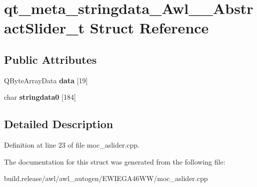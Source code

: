\hypertarget{structqt__meta__stringdata___awl_____abstract_slider__t}{}\section{qt\+\_\+meta\+\_\+stringdata\+\_\+\+Awl\+\_\+\+\_\+\+Abstract\+Slider\+\_\+t Struct Reference}
\label{structqt__meta__stringdata___awl_____abstract_slider__t}
\subsection*{Public Attributes}
\begin{DoxyCompactItemize}
\item 
\mbox{\label{structqt__meta__stringdata___awl_____abstract_slider__t_a981b69e61eccb9d7469d9cd4b51aa298}} 
Q\+Byte\+Array\+Data {\bfseries data} \mbox{[}19\mbox{]}
\item 
\mbox{\label{structqt__meta__stringdata___awl_____abstract_slider__t_a94d2431b15920deb119e0a692cd1cd58}} 
char {\bfseries stringdata0} \mbox{[}184\mbox{]}
\end{DoxyCompactItemize}


\subsection{Detailed Description}


Definition at line 23 of file moc\+\_\+aslider.\+cpp.



The documentation for this struct was generated from the following file\+:\begin{DoxyCompactItemize}
\item 
build.\+release/awl/awl\+\_\+autogen/\+E\+W\+I\+E\+G\+A46\+W\+W/moc\+\_\+aslider.\+cpp\end{DoxyCompactItemize}
